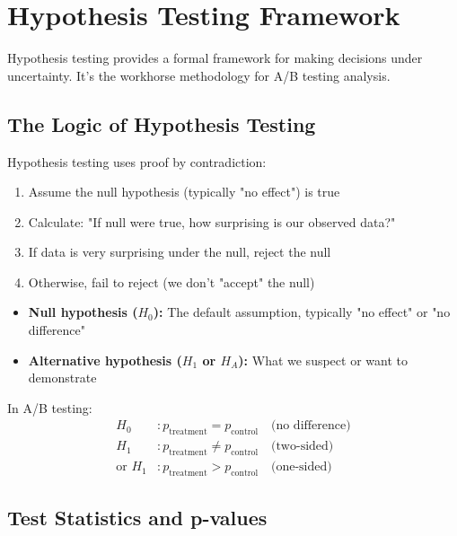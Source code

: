 \section{Hypothesis Testing Framework}

Hypothesis testing provides a formal framework for making decisions under uncertainty. It's the workhorse methodology for A/B testing analysis.

\subsection{The Logic of Hypothesis Testing}

Hypothesis testing uses proof by contradiction:
\begin{enumerate}
    \item Assume the null hypothesis (typically "no effect") is true
    \item Calculate: "If null were true, how surprising is our observed data?"
    \item If data is very surprising under the null, reject the null
    \item Otherwise, fail to reject (we don't "accept" the null)
\end{enumerate}

\begin{definition}
\begin{itemize}
    \item \textbf{Null hypothesis ($H_0$):} The default assumption, typically "no effect" or "no difference"
    \item \textbf{Alternative hypothesis ($H_1$ or $H_A$):} What we suspect or want to demonstrate
\end{itemize}

In A/B testing:
\begin{align}
H_0&: p_{\text{treatment}} = p_{\text{control}} \quad \text{(no difference)} \\
H_1&: p_{\text{treatment}} \neq p_{\text{control}} \quad \text{(two-sided)} \\
\text{or } H_1&: p_{\text{treatment}} > p_{\text{control}} \quad \text{(one-sided)}
\end{align}
\end{definition}

\subsection{Test Statistics and p-values}

